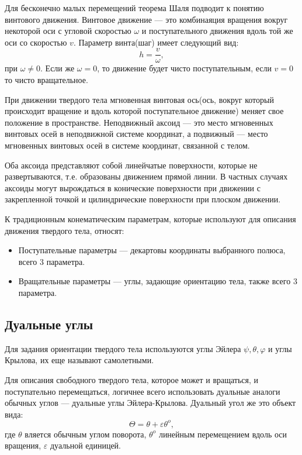 Для бесконечно малых перемещений теорема Шаля подводит к понятию винтового движения. Винтовое движение --- это комбинаяция вращения вокруг некоторой оси с угловой скоростью $\omega$ и поступательного движения вдоль той же оси со скоростью $v$. Параметр винта(шаг) имеет следующий вид:
\begin{equation*}
    h = \frac{v}{\omega},
\end{equation*}
при $\omega \neq 0$. Если же $\omega = 0$, то движение будет чисто поступательным, если $v = 0$ то чисто вращательное.

При движении твердого тела мгновенная винтовая ось(ось, вокруг который происходит вращение и вдоль которой поступательное движение) меняет свое положение в пространстве.
Неподвижный аксоид --- это место мгновенных винтовых осей в неподвижной системе координат, а подвижный --- место мгновенных винтовых осей в системе координат, связанной с телом.

Оба аксоида представляют собой линейчатые поверхности, которые не развертываются, т.е. образованы движением прямой линии. В частных случаях аксоиды могут вырождаться в конические поверхности при движении с закрепленной точкой и цилиндрические поверхности при плоском движении. 

К традиционным конематическим параметрам, которые используют для описания движения твердого тела, относят:
\begin{itemize}
    \item Поступательные параметры --- декартовы координаты выбранного полюса, всего 3 параметра.
    \item Вращательные параметры --- углы, задающие ориентацию тела, также всего 3 параметра.
\end{itemize}

\subsection{Дуальные углы}

Для задания ориентации твердого тела используются углы Эйлера $\psi, \theta, \varphi$ и углы Крылова, их еще называют самолетными.

Для описания свободного твердого тела, которое может и вращаться, и поступательно перемещаться, логичнее всего использовать дуальные аналоги обычных углов --- дуальные углы Эйлера-Крылова.
Дуальный угол же это объект вида:
\begin{equation*}
    \Theta = \theta + \varepsilon \theta^o,
\end{equation*}
где $\theta$ вляется обычным углом поворота, $\theta^o$ линейным перемещением вдоль оси вращения, $\varepsilon$ дуальной единицей.

